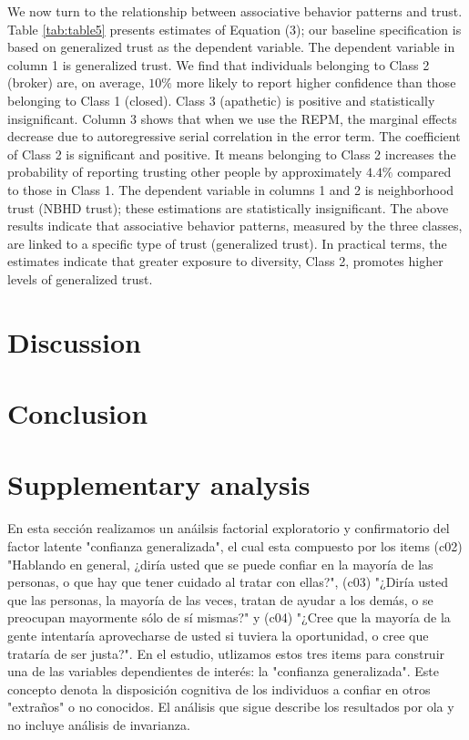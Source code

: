 We now turn to the relationship between associative behavior patterns and trust. Table \ref{tab:table5} presents estimates of Equation (3); our baseline specification is based on generalized trust as the dependent variable. The dependent variable in column 1 is generalized trust. We find that individuals belonging to Class 2 (broker) are, on average, $10\%$ more likely to report higher confidence than those belonging to Class 1 (closed). Class 3 (apathetic) is positive and statistically insignificant. Column 3 shows that when we use the REPM, the marginal effects decrease due to autoregressive serial correlation in the error term. The coefficient of Class 2 is significant and positive. It means belonging to Class 2 increases the probability of reporting trusting other people by approximately $4.4\%$ compared to those in Class 1. The dependent variable in columns 1 and 2 is neighborhood trust (NBHD trust); these estimations are statistically insignificant. The above results indicate that associative behavior patterns, measured by the three classes, are linked to a specific type of trust (generalized trust). In practical terms, the estimates indicate that greater exposure to diversity, Class 2, promotes higher levels of generalized trust.






\section{Discussion}

\section{Conclusion}


\newpage

\printbibliography

\newpage

\section{Supplementary analysis}

En esta sección realizamos un anáilsis factorial exploratorio y confirmatorio del factor latente "confianza generalizada", el cual esta compuesto por los items  (c02) "Hablando en general, ¿diría usted que se puede confiar en la mayoría de las personas, o que hay que tener cuidado al tratar con ellas?", (c03) "¿Diría usted que las personas, la mayoría de las veces, tratan de ayudar a los demás, o se preocupan mayormente sólo de sí mismas?" y (c04) "¿Cree que la mayoría de la gente intentaría aprovecharse de usted si tuviera la oportunidad, o cree que trataría de ser justa?". En el estudio, utlizamos estos tres items para construir una de las variables dependientes de interés: la "confianza generalizada". Este concepto denota la disposición cognitiva de los individuos a confiar en otros "extraños" o no conocidos. El análisis que sigue describe los resultados por ola y no incluye análisis de invarianza. 


